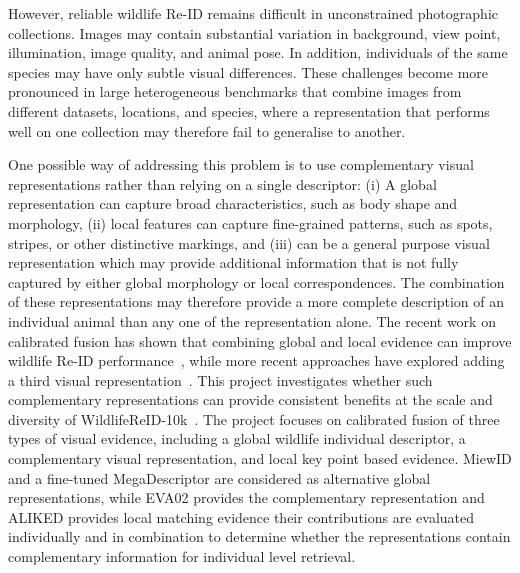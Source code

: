 \documentclass[runningheads]{llncs}
\begin{document}
However, reliable wildlife Re-ID remains difficult in unconstrained
photographic collections. Images may contain substantial variation in
background, view point, illumination, image quality, and animal pose. In
addition, individuals of the same species may have only subtle visual
differences. These challenges become more pronounced in large heterogeneous
benchmarks that combine images from different datasets, locations, and species, where
a representation that performs well on one collection may therefore fail to
generalise to another.

One possible way of addressing this problem is to use complementary visual
representations rather than relying on a single descriptor: (i) A global
representation can capture broad characteristics, such as body shape and
morphology, (ii) local features can capture fine-grained patterns, such as
spots, stripes, or other distinctive markings, and (iii) can be a general purpose visual
representation which may provide additional information that is not fully captured
by either global morphology or local correspondences. The combination of these
representations may therefore provide a more complete description of an
individual animal than any one of the representation alone. The recent work on calibrated
fusion has shown that combining global and local evidence can improve wildlife
Re-ID performance~\cite{cermak2024wildfusion}, while more recent approaches
have explored adding a third visual representation~\cite{kim2025fusion}.
This project investigates whether such complementary representations can
provide consistent benefits at the scale and diversity of WildlifeReID-10k~\cite{adam2025wildlifereid}. 
The project focuses on calibrated fusion of three types of visual evidence, including a global wildlife
individual descriptor, a complementary visual representation, and local
key point based evidence. MiewID and a fine-tuned MegaDescriptor are considered
as alternative global representations, while EVA02 provides the complementary
representation and ALIKED provides local matching evidence their contributions
are evaluated individually and in combination to determine whether the
representations contain complementary information for individual level retrieval.
\end{document}
